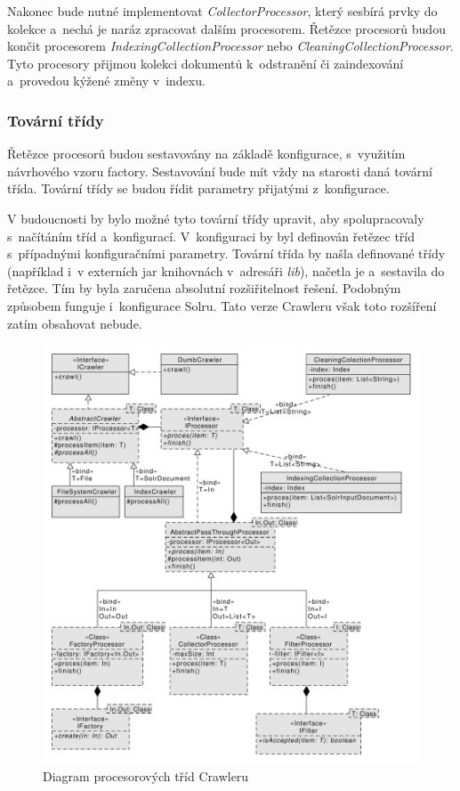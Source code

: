 Nakonec bude nutné implementovat \emph{CollectorProcessor}, který sesbírá prvky do kolekce a~nechá je naráz zpracovat dalším procesorem. Řetězce procesorů budou končit procesorem  \emph{IndexingCollectionProcessor} nebo \emph{CleaningCollectionProcessor}. Tyto procesory přijmou kolekci dokumentů k~odstranění či zaindexování a~provedou kýžené změny v~indexu.

\subsubsection{Tovární třídy}
Řetězce procesorů budou sestavovány na základě konfigurace, s~využitím návrhového vzoru factory. Sestavování bude mít vždy na starosti daná tovární třída. Tovární třídy se budou řídit parametry přijatými z~konfigurace.

V budoucnosti by bylo možné tyto tovární třídy upravit, aby spolupracovaly s~načítáním tříd a~konfigurací. V~konfiguraci by byl definován řetězec tříd s~případnými konfiguračními parametry. Tovární třída by našla definované třídy (například i~v externích jar knihovnách v~adresáři \emph{lib}), načetla je a~sestavila do řetězce. Tím by byla zaručena absolutní rozšiřitelnost řešení. Podobným způsobem funguje i~konfigurace Solru. Tato verze Crawleru však toto rozšíření zatím obsahovat nebude.

\begin{figure}[h]
\begin{center}
\includegraphics[width=13cm]{ProcessorClasses}
\caption{Diagram procesorových tříd Crawleru}
\label{fig:ProcessorClasses}
\end{center}
\end{figure}

